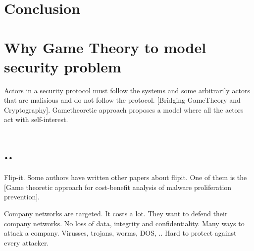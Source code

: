 \documentclass[10pt]{article}
\begin{document}
\section{Conclusion}

\section{Why Game Theory to model security problem}
Actors in a security protocol must follow the systems and some arbitrarily actors that are malisious and do not follow the protocol. [Bridging GameTheory and Cryptography]. Gametheoretic approach proposes a model where all the actors act with self-interest. 

\section{..}

Flip-it. Some authors have written other papers about flipit. One of them is the [Game theoretic approach for cost-benefit analysis of malware proliferation prevention]. 


Company networks are targeted. It costs a lot. They want to defend their company networks. No loss of data, integrity and confidentiality.  Many ways to attack a company. Virusses, trojans, worms, DOS, .. Hard to protect against every attacker.


\end{document}
